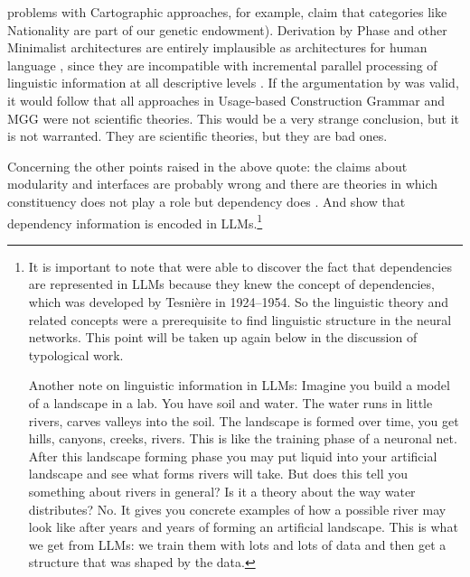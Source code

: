 problems with Cartographic approaches, for example,  claim that
categories like Nationality are part of our genetic endowment). Derivation by Phase \citep{Chomsky2008a} and other Minimalist architectures \citep[812, 830]{Richards2015a} are
entirely implausible as architectures for human language \citep[Section~3.6]{BM2021a}, since they
are incompatible with incremental parallel processing of linguistic information at all descriptive
levels \citep{Marslen-Wilson75a,TSKES96a,Labelle2007a}.
If the argumentation by
\citeauthor{FoxKatzir2024a} was valid, it would follow that all approaches in 
Usage-based Construction Grammar and MGG were not scientific theories. This would be a very strange
conclusion, but it is not warranted. They are scientific theories, but they are bad ones.

Concerning the other points raised in the above quote: the claims about modularity and interfaces are probably
wrong \parencites{Pulvermueller1999a-u,PCS2013a-u}[, 27]{Jackendoff2000a}{Kuhn2007a} and there are theories in which constituency does not play
a role but dependency does \citep{Tesniere59a-Eng}. And \citet{ClarkKhandelwalLevaManning2019a,HewittManning2019a,ManningClarkHewitt2020a} show that
dependency information is encoded in LLMs.\footnote{\label{fn-dependencies}%
  It is important to note that \citet{ClarkKhandelwalLevaManning2019a,HewittManning2019a,ManningClarkHewitt2020a} were able to discover the fact that
  dependencies are represented in LLMs because they knew the concept of dependencies, which was
  developed by Tesnière in 1924--1954. So the linguistic theory and related concepts were a prerequisite
  to find linguistic structure in the neural networks. This point will be taken up again
  below in the discussion of typological work.

  Another note on linguistic information in LLMs: Imagine you build a model of a landscape in a
  lab. You have soil and water. The water runs in little rivers, carves valleys into the soil. The
  landscape is formed over time, you get hills, canyons, creeks, rivers. This is like the training
  phase of a neuronal net. After this landscape forming phase you may put liquid into your artificial
  landscape and see what forms rivers will take. But does this tell you something about rivers in
  general? Is it a theory about the way water distributes? No. It gives you concrete examples of how a possible
  river may look like after years and years of forming an artificial landscape. This is what we get
  from LLMs: we train them with lots and lots of data and then get a structure that was shaped by
  the data.
}

